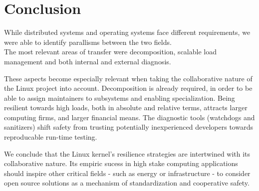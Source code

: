 \chapter{Conclusion}

While distributed systems and operating systems face different requirements, we were able to identify parallisms between the two fields. \\
The most relevant areas of transfer were decomposition, scalable load management and both internal and external diagnosis.

These aspects become especially relevant when taking the collaborative nature of the Linux project into account. Decomposition is already required, in order to be able to assign maintainers to subsystems and enabling specialization. Being resilient towards high loads, both in absolute and relative terms, attracts larger computing firms, and larger financial means. The diagnostic tools (watchdogs and sanitizers) shift safety from trusting potentially inexperienced developers towards reproducable run-time testing.

We conclude that the Linux kernel's resilience strategies are intertwined with its collaborative nature. Its empiric sucess in high stake computing applications should inspire other critical fields - such as energy or infrastructure - to consider open source solutions as a mechanism of standardization and cooperative safety.
